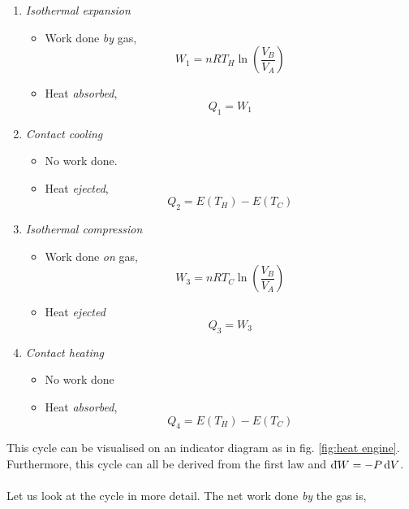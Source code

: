 \documentclass{book}
\newcommand{\dbar}{\mathrm{d}\hspace*{-0.08em}\bar{}\hspace*{0.1em}}
\begin{document}
\begin{enumerate}
	\item \textit{Isothermal expansion}
	\begin{itemize}
		\item Work done \textit{by} gas,
		\begin{equation}
			W_1 = nRT_H\ln{\left(\frac{V_B}{V_A}\right)}
		\end{equation}
		\item Heat \textit{absorbed},
		\begin{equation}
			Q_1 = W_1
		\end{equation}
	\end{itemize}
	\item \textit{Contact cooling}
	\begin{itemize}
		\item No work done.
		\item Heat \textit{ejected},
		\begin{equation}
			Q_2 = E(T_H) - E(T_C)
		\end{equation}
	\end{itemize}
	\item \textit{Isothermal compression}
	\begin{itemize}
		\item Work done \textit{on} gas,
		\begin{equation}
			W_3 = nRT_C\ln\left(\frac{V_B}{V_A}\right)
		\end{equation}
		\item Heat \textit{ejected}
		\begin{equation}
			Q_3 = W_3
		\end{equation}
	\end{itemize}
	\item \textit{Contact heating}
	\begin{itemize}
		\item No work done
		\item Heat \textit{absorbed},
		\begin{equation}
			Q_4 = E(T_H) - E(T_C)
		\end{equation}
	\end{itemize}
\end{enumerate}
This cycle can be visualised on an indicator diagram as in fig. \ref{fig:heat engine}. Furthermore, this cycle can all be derived from the first law and $\dbar W = -P\dd{V}$. 
\\\\
Let us look at the cycle in more detail. The net work done \textit{by} the gas is,
\end{document}
